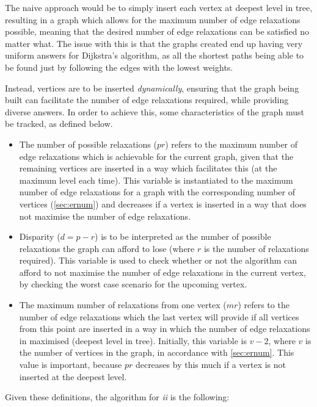 \documentclass{l4proj}
\begin{document}
The naive approach would be to simply insert each vertex at deepest level in tree, resulting in a graph which allows for the maximum number of edge relaxations possible, meaning that the desired number of edge relaxations can be satisfied no matter what. The issue with this is that the graphs created end up having very uniform answers for Dijkstra's algorithm, as all the shortest paths being able to be found just by following the edges with the lowest weights.

Instead, vertices are to be inserted \emph{dynamically}, ensuring that the graph being built can facilitate the number of edge relaxations required, while providing diverse answers. In order to achieve this, some characteristics of the graph must be tracked, as defined below.

\begin{itemize}
	\item
	The number of possible relaxations ($pr$) refers to the maximum number of edge relaxations which is achievable for the current graph, given that the remaining vertices are inserted in a way which facilitates this (at the maximum level each time). This variable is instantiated to the maximum number of edge relaxations for a graph with the corresponding number of vertices (\autoref{sec:ernum}) and decreases if a vertex is inserted in a way that does not maximise the number of edge relaxations. 
	\item
	Disparity ($d = p - r$) is to be interpreted as the number of possible relaxations the graph can afford to lose (where $r$ is the number of relaxations required). This variable is used to check whether or not the algorithm can afford to not maximise the number of edge relaxations in the current vertex, by checking the worst case scenario for the upcoming vertex.
	\item
	The maximum number of relaxations from one vertex ($mr$) refers to the number of edge relaxations which the last vertex will provide if all vertices from this point are inserted in a way in which the number of edge relaxations in maximised (deepest level in tree). Initially, this variable is $v-2$, where $v$ is the number of vertices in the graph, in accordance with \autoref{sec:ernum}. This value is important, because $pr$ decreases by this much if a vertex is not inserted at the deepest level.
\end{itemize}

Given these definitions, the algorithm for \emph{ii} is the following:
\end{document}
